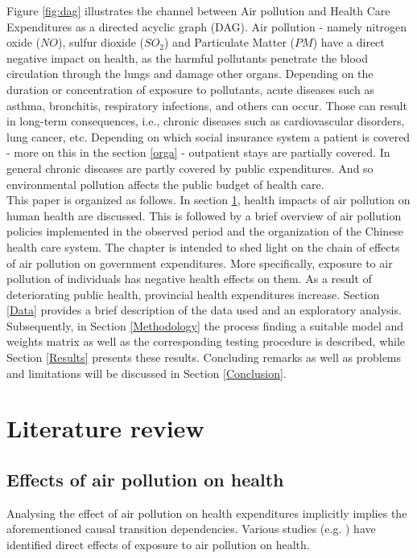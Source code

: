 \documentclass[
]{article}
\begin{document}
	Figure \ref{fig:dag} illustrates the channel between Air pollution and Health Care Expenditures as a directed acyclic graph (DAG). Air pollution - namely nitrogen oxide ($NO$), sulfur dioxide ($SO_2$) and Particulate Matter ($PM$) have a direct negative impact on health, as the harmful pollutants penetrate the blood circulation through the lungs and damage other organs. Depending on the duration or concentration of exposure to pollutants, acute diseases such as asthma, bronchitis, respiratory infections, and others can occur. Those can result in long-term consequences, i.e., chronic diseases such as cardiovascular disorders, lung cancer, etc.
	Depending on which social insurance system a patient is covered - more on this in the section \ref{orga} - outpatient stays are partially covered. In general chronic diseases are partly covered by public expenditures. And so environmental pollution affects the public budget of health care. \\
	This paper is organized as follows. In section \ref{Literature review}, health impacts of air pollution on human health are discussed. This is followed by a brief overview of air pollution policies implemented in the observed period and the organization of the Chinese health care system. The chapter is intended to shed light on the chain of effects of air pollution on government expenditures. More specifically, exposure to air pollution of individuals has negative health effects on them. As a result of deteriorating public health, provincial health expenditures increase.
	Section \ref{Data} provides a brief description of the data used and an exploratory analysis.
	Subsequently, in Section \ref{Methodology} the process finding a suitable model and weights matrix as well as the corresponding testing procedure is described, while Section \ref{Results} presents these results.
	Concluding remarks as well as problems and limitations will be discussed  in Section \ref{Conclusion}.

	\hypertarget{literature review}{%
		\section{Literature review}\label{Literature review}}

	\subsection{Effects of air pollution on health}

	Analysing the effect of air pollution on health expenditures implicitly implies the aforementioned causal transition dependencies. Various studies (e.g. \cite{franklin2015air,NYBERG2000,LEL2015}) have identified direct effects of exposure to air pollution on health.
\end{document}
